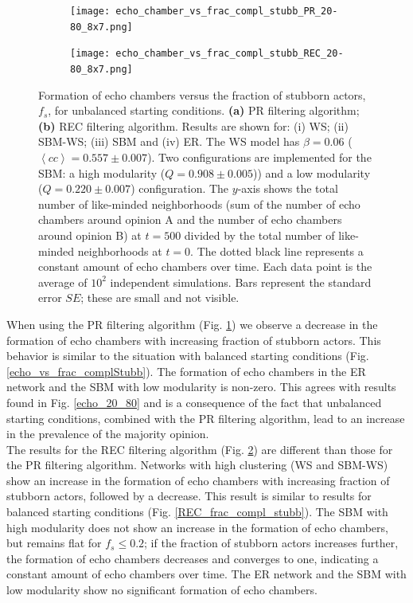 \documentclass[11 pt , letterpaper , twoside , openright]{book}
\begin{document}
\begin{figure}[H]
  \begin{subfigure}[b]{0.49\textwidth}
    \caption{}
  	\texttt{[image: echo\_chamber\_vs\_frac\_compl\_stubb\_PR\_20-80\_8x7.png]}
    \label{PR_frac_compl_stubb_20-80}
  \end{subfigure}
  \begin{subfigure}[b]{0.49\textwidth}
    \caption{}
  	\texttt{[image: echo\_chamber\_vs\_frac\_compl\_stubb\_REC\_20-80\_8x7.png]}
    \label{REC_frac_compl_stubb_20-80}
  \end{subfigure}
  \captionsetup{format=plain}
  \caption[Formation of echo chambers versus fraction of stubborn actors for the PR and REC filtering algorithms and unbalanced starting conditions.]{Formation of echo chambers versus the fraction of stubborn actors, $f_s$, for unbalanced starting conditions. \textbf{(a)} PR filtering algorithm; \textbf{(b)} REC filtering algorithm. Results are shown for: (i) WS; (ii) SBM-WS; (iii) SBM and (iv) ER. The WS model has $\beta = 0.06$ ($\left<cc\right> = 0.557 \pm 0.007$). Two configurations are implemented for the SBM: a high modularity ($Q = 0.908 \pm 0.005$)) and a low modularity ($Q = 0.220 \pm 0.007$) configuration. The $y$-axis shows the total number of like-minded neighborhoods (sum of the number of echo chambers around opinion A and the number of echo chambers around opinion B) at $t=500$ divided by the total number of like-minded neighborhoods at $t=0$. The dotted black line represents a constant amount of echo chambers over time. Each data point is the average of $10^2$ independent simulations. Bars represent the standard error $SE$; these are small and not visible.}
\label{echo_vs_frac_complStubb_PR-REC_20-80}
\end{figure}
\noindent
When using the PR filtering algorithm (Fig. \ref{PR_frac_compl_stubb_20-80}) we observe a decrease in the formation of echo chambers with increasing fraction of stubborn actors. This behavior is similar to the situation with balanced starting conditions (Fig. \ref{echo_vs_frac_complStubb}). The formation of echo chambers in the ER network and the SBM with low modularity is non-zero. This agrees with results found in Fig. \ref{echo_20_80} and is a consequence of the fact that unbalanced starting conditions, combined with the PR filtering algorithm, lead to an increase in the prevalence of the majority opinion. \\
\newline
The results for the REC filtering algorithm (Fig. \ref{REC_frac_compl_stubb_20-80}) are different than those for the PR filtering algorithm. Networks with high clustering (WS and SBM-WS) show an increase in the formation of echo chambers with increasing fraction of stubborn actors, followed by a decrease. This result is similar to results for balanced starting conditions (Fig. \ref{REC_frac_compl_stubb}). The SBM with high modularity does not show an increase in the formation of echo chambers, but remains flat for $f_s \leqslant 0.2$; if the fraction of stubborn actors increases further, the formation of echo chambers decreases and converges to one, indicating a constant amount of echo chambers over time. The ER network and the SBM with low modularity show no significant formation of echo chambers.\\
\end{document}
